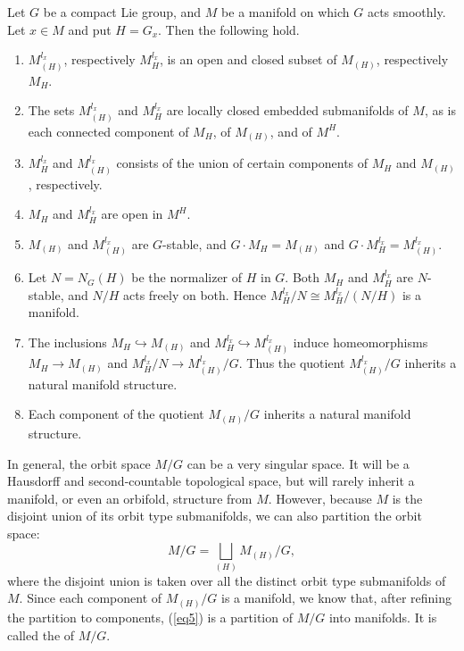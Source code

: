 \begin{Proposition} \label{prop2}
Let $G$ be a compact Lie group, and $M$ be a manifold on which $G$ acts smoothly.  Let $x \in M$ and put $H = G_x$.  Then the following hold.
\begin{enumerate} \itemsep=0pt\litlet

  \item $M_{(H)}^{l_x}$, respectively $M_{H}^{l_x}$, is an open and closed subset of $M_{(H)}$, respectively $M_H$.

  \item The sets $M_{(H)}^{l_x}$ and $M_H^{l_x}$ are locally closed embedded submanifolds of $M$, as is each connected component of $M_H$, of $M_{(H)}$, and of $M^H$.

  \item $M_H^{l_x}$ and $M_{(H)}^{l_x}$ consists of the union of certain components of $M_H$ and $M_{(H)}$, respectively.

  \item $M_H$ and $M_H^{l_x}$ are open in $M^H$.

  \item $M_{(H)}$ and $M_{(H)}^{l_x}$ are $G$-stable, and $G \cdot M_H = M_{(H)}$ and $G \cdot M_H^{l_x} = M_{(H)}^{l_x}$.

  \item Let $N=N_G(H)$ be the normalizer of $H$ in $G$. Both $M_H$ and $M_H^{l_x}$ are $N$-stable, and $N/H$ acts freely on both.  Hence $M_H^{l_x} / N \cong M_H^{l_x} / \left( N/H \right)$ is a manifold.

  \item The inclusions $M_H \hookrightarrow M_{(H)}$ and $M_H^{l_x} \hookrightarrow M_{(H)}^{l_x}$ induce homeomorphisms $M_H \to M_{(H)}$ and $M_H^{l_x} / N \to M_{(H)}^{l_x} / G$.  Thus the quotient $M_{(H)}^{l_x} / G$ inherits a natural manifold structure.

  \item Each component of the quotient $M_{(H)} / G$ inherits a natural manifold structure.
\end{enumerate}
\end{Proposition}


In general, the orbit space $M/G$ can be a very singular space.  It will be a Hausdorf\/f and second-countable topological space, but will rarely inherit a manifold, or even an orbifold, structure from $M$.
However, because $M$ is the disjoint union of its orbit type submanifolds, we can also partition the orbit space:
\begin{equation}
 \label{eq5}
   M/G = \bigsqcup_{(H)} M_{(H)}/G,
\end{equation}
where the disjoint union is taken over all the distinct orbit type submanifolds of $M$.
Since each component of $M_{(H)}/G$ is a manifold, we know that, after ref\/ining the partition to components, (\ref{eq5}) is a partition of $M/G$ into manifolds.  It is called the  of $M/G$.


